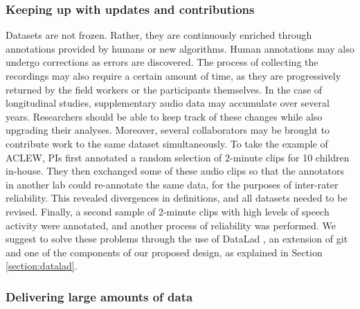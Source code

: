 \documentclass[smallextended]{svjour3}       %
\begin{document}
\subsubsection*{Keeping up with updates and contributions}

Datasets are not frozen. Rather, they are continuously enriched through annotations provided by humans or new algorithms. Human annotations may also undergo corrections as errors are discovered. The process of collecting the recordings may also require a certain amount of time, as they are progressively returned by the field workers or the participants themselves. In the case of longitudinal studies, supplementary audio data may accumulate over several years. Researchers should be able to keep track of these changes while also upgrading their analyses. Moreover, several collaborators may be brought to contribute work to the same dataset simultaneously. To take the example of ACLEW, PIs first annotated a random selection of 2-minute clips for 10 children in-house. They then exchanged some of these audio clips so that the annotators in another lab could re-annotate the same data, for the purposes of inter-rater reliability. This revealed divergences in definitions, and all datasets needed to be revised. Finally, a second sample of 2-minute clips with high levels of speech activity were annotated, and another process of reliability was performed. We suggest to solve these problems through the use of DataLad \citep{datalad_paper}, an extension of git and one of the components of our proposed design, as explained in Section \ref{section:datalad}.

\subsubsection*{Delivering large amounts of data}
\end{document}
